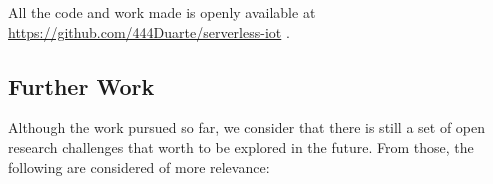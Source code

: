 All the code and work made is openly available at \url{https://github.com/444Duarte/serverless-iot} .








\subsection{Further Work}

Although the work pursued so far, we consider that there is still a set of open research challenges that worth to be explored in the future. From those, the following are considered of more relevance:

